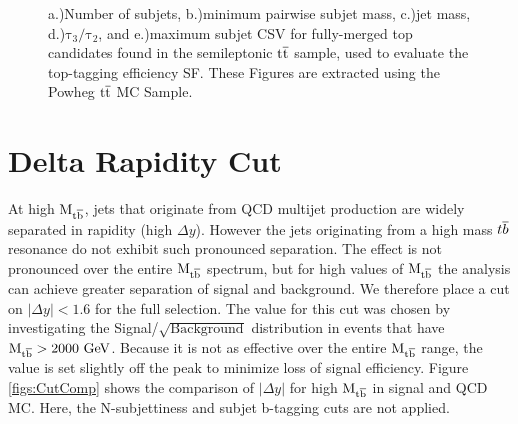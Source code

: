 \begin{figure}
\begin{center}
\end{center}
\caption{ a.)Number of subjets, b.)minimum pairwise subjet mass, c.)jet mass, d.)$\mathrm{\tau_{3}/\tau_{2}}$, and  e.)maximum subjet CSV for fully-merged top candidates
  found in the semileptonic $\mathrm{t\overline{t}}$ sample, used to evaluate the top-tagging efficiency SF.  These Figures are extracted using the Powheg $\mathrm{t\overline{t}}$ MC Sample. }%
\label{figs:type1_topmasspowheg}
\end{figure}

\section{Delta Rapidity Cut}
\label{sec:deltarapidity}
At high $\mathrm{M_{{t\overline{b}}}}$, jets that originate from QCD multijet production are widely separated in rapidity (high $\Delta y$).
However the jets originating from a high mass ${t\overline{b}}$ resonance do not exhibit such pronounced separation.  The effect is not pronounced over the entire 
$\mathrm{M_{{t\overline{b}}}}$ spectrum, but for high values of $\mathrm{M_{{t\overline{b}}}}$ the analysis can achieve greater separation of signal and background.  We therefore place a cut on $|\Delta y| < 1.6$ 
for the full selection.  The value for this cut was chosen by investigating the Signal/$\sqrt{\text{Background}}$ distribution in events that have $\mathrm{M_{{t\overline{b}}}}>2000~\mathrm{GeV}$.  
Because it is not as effective over the entire $\mathrm{M_{{t\overline{b}}}}$ range, the value is set slightly off the peak to minimize loss of signal efficiency.
Figure \ref{figs:CutComp} shows the comparison of $|\Delta y|$ for high $\mathrm{M_{{t\overline{b}}}}$ in signal and QCD MC.  
Here, the N-subjettiness and subjet b-tagging cuts are not applied.

